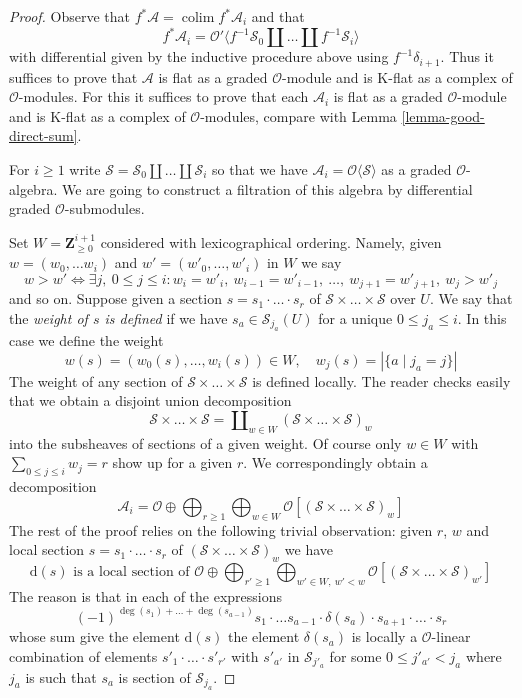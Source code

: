 \documentclass[10pt,a4paper]{amsart}
\theoremstyle{plain}
\theoremstyle{definition}
\theoremstyle{remark}
\numberwithin{equation}{subsection}
\def\colim{\mathop{\mathrm{colim}}\nolimits}
\begin{document}
\begin{proof}
Observe that $f^*\mathcal{A} = \colim f^*\mathcal{A}_i$
and that
$$
f^*\mathcal{A}_i = \mathcal{O}'\langle
f^{-1}\mathcal{S}_0 \amalg \ldots \amalg f^{-1}\mathcal{S}_i\rangle
$$
with differential given by the inductive procedure above using
$f^{-1}\delta_{i + 1}$. Thus it suffices to prove that $\mathcal{A}$
is flat as a graded $\mathcal{O}$-module and
is K-flat as a complex of $\mathcal{O}$-modules.
For this it suffices to prove that each $\mathcal{A}_i$
is flat as a graded $\mathcal{O}$-module and
is K-flat as a complex of $\mathcal{O}$-modules, compare with
Lemma \ref{lemma-good-direct-sum}.


\medskip\noindent
For $i \geq 1$
write $\mathcal{S} = \mathcal{S}_0 \amalg \ldots \amalg \mathcal{S}_i$
so that we have $\mathcal{A}_i = \mathcal{O}\langle \mathcal{S} \rangle$
as a graded $\mathcal{O}$-algebra. We are going to construct a filtration
of this algebra by differential graded $\mathcal{O}$-submodules.

\medskip\noindent
Set $W = \mathbf{Z}_{\geq 0}^{i + 1}$ considered with lexicographical
ordering. Namely, given $w = (w_0, \ldots w_i)$ and
$w' = (w'_0, \ldots, w'_i)$ in $W$ we say
$$
w > w' \Leftrightarrow
\exists j,\ 0 \leq j \leq i :
w_i = w'_i,\ w_{i - 1} = w'_{i - 1},\ \ldots ,
\ w_{j + 1} = w'_{j + 1},\ w_j > w'_j
$$
and so on. Suppose given a section
$s = s_1 \cdot \ldots \cdot s_r$ of
$\mathcal{S} \times \ldots \times \mathcal{S}$
over $U$. We say that the {\it weight of $s$ is defined}
if we have $s_a \in \mathcal{S}_{j_a}(U)$ for a unique
$0 \leq j_a \leq i$. In this case we define the weight
$$
w(s) = (w_0(s), \ldots, w_i(s)) \in W,\quad
w_j(s) = |\{a \mid j_a = j\}|
$$
The weight of any section of $\mathcal{S} \times \ldots \times \mathcal{S}$
is defined locally. The reader checks easily that we obtain a disjoint union
decomposition
$$
\mathcal{S} \times \ldots \times \mathcal{S} =
\coprod\nolimits_{w \in W} \left(
\mathcal{S} \times \ldots \times \mathcal{S}\right)_w
$$
into the subsheaves of sections of a given weight. Of course
only $w \in W$ with $\sum_{0 \leq j \leq i} w_j = r$ show up for a given $r$.
We correspondingly obtain a decomposition
$$
\mathcal{A}_i = \mathcal{O} \oplus
\bigoplus\nolimits_{r \geq 1}
\bigoplus\nolimits_{w \in W}
\mathcal{O}[\left(\mathcal{S} \times \ldots \times \mathcal{S}\right)_w]
$$
The rest of the proof relies on the following trivial observation:
given $r$, $w$ and local section $s = s_1 \cdot \ldots \cdot s_r$ of
$\left(\mathcal{S} \times \ldots \times \mathcal{S}\right)_w$
we have
$$
\text{d}(s) \text{ is a local section of } \mathcal{O} \oplus
\bigoplus\nolimits_{r' \geq 1}
\bigoplus\nolimits_{w' \in W,\ w' < w}
\mathcal{O}[\left(\mathcal{S} \times \ldots \times \mathcal{S}\right)_{w'}]
$$
The reason is that in each of the expressions
$$
(-1)^{\deg(s_1) + \ldots + \deg(s_{a - 1})}
s_1 \cdot \ldots s_{a - 1} \cdot \delta(s_a) \cdot
s_{a + 1} \cdot \ldots \cdot s_r
$$
whose sum give the element $\text{d}(s)$ the element $\delta(s_a)$
is locally a $\mathcal{O}$-linear combination of elements
$s'_1 \cdot \ldots \cdot s'_{r'}$ with $s'_{a'}$ in
$\mathcal{S}_{j'_a}$ for some $0 \leq j'_{a'} < j_a$ where $j_a$ is such that
$s_a$ is section of $\mathcal{S}_{j_a}$.


\end{proof}
\end{document}
